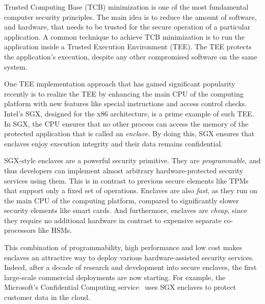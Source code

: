 
\vspace{10pt}


Trusted Computing Base (TCB) minimization is one of the most fundamental computer security principles. The main idea is to reduce the amount of software, and hardware, that needs to be trusted for the secure operation of a particular application. A common technique to achieve TCB minimization is to run the application inside a Trusted Execution Environment (TEE). The TEE protects the application's execution, despite any other compromised software on the same system.

One TEE implementation approach that has gained significant popularity recently is to realize the TEE by enhancing the main CPU of the computing platform with new features like special instructions and access control checks. Intel's SGX, designed for the x86 architecture, is a prime example of such TEE. In SGX, the CPU ensures that no other process can access the memory of the protected application that is called an \emph{enclave}. By doing this, SGX ensures that enclaves enjoy execution integrity and their data remains confidential.  


SGX-style enclaves are a powerful security primitive. They are \emph{programmable}, and thus developers can implement almost arbitrary hardware-protected security services using them. This is in contrast to previous secure elements like TPMs that support only a fixed set of operations. Enclaves are also \emph{fast}, as they run on the main CPU of the computing platform, compared to significantly slower security elements like smart cards. And furthermore, enclaves are \emph{cheap}, since they require no additional hardware in contrast to expensive separate co-processors like HSMs. 

This combination of programmability, high performance and low cost makes enclaves an attractive way to deploy various hardware-assisted security services. Indeed, after a decade of research and development into secure enclaves, the first large-scale commercial deployments are now starting. For example, the Microsoft's Confidential Computing service~\cite{azure} uses SGX enclaves to protect customer data in the cloud.

